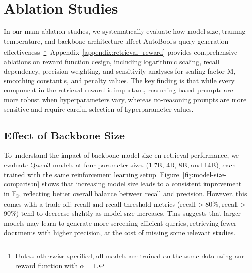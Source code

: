 \section{Ablation Studies}
\label{sec:ablation}


In our main ablation studies, we systematically evaluate how model size, training temperature, and backbone architecture affect AutoBool's query generation effectiveness~\footnote{Unless otherwise specified, all models are trained on the same data using our reward function with \(\alpha = 1\).}.  Appendix~\ref{appendix:retrieval_reward} provides comprehensive ablations on reward function design, including logarithmic scaling, recall dependency, precision weighting, and sensitivity analyses for scaling factor M, smoothing constant s, and penalty values. The key finding is that 
while every component in the retrieval reward is important, reasoning-based prompts are more robust when hyperparameters vary, whereas no-reasoning prompts are more sensitive and require careful selection of hyperparameter values.


\subsection{Effect of Backbone Size}

To understand the impact of backbone model size on retrieval performance, we evaluate Qwen3 models at four parameter sizes (1.7B, 4B, 8B, and 14B), each trained with the same reinforcement learning setup. Figure~\ref{fig:model-size-comparison} shows that increasing model size leads to a consistent improvement in F\textsubscript{3}, reflecting better overall balance between recall and precision. However, this comes with a trade-off: recall and recall-threshold metrics (recall > 80\%, recall > 90\%) tend to decrease slightly as model size increases. This suggests that larger models may learn to generate more screening-efficient queries, retrieving fewer documents with higher precision, at the cost of missing some relevant studies.

